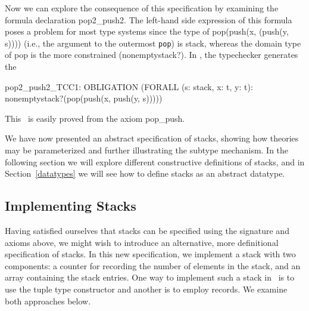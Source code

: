 Now we can explore the consequence of this specification by examining
the formula declaration {\stt pop2\_push2}.  The left-hand side
expression of this formula poses a problem for most type systems since
the type of {\stt pop(push(x, (push(y, s))))} (i.e., the argument to
the outermost {\tt pop}) is {\stt stack}, whereas the domain type of
{\stt pop} is the more constrained {\stt (nonemptystack?)}.  In \pvs,
the typechecker generates the \tcc\
\begin{pvsex}
  pop2_push2_TCC1: OBLIGATION
    (FORALL (s: stack, x: t, y: t):
       nonemptystack?(pop(push(x, push(y, s)))))
\end{pvsex}
This \tcc\ is easily proved from the axiom {\stt pop\_push}.

We have now presented an abstract specification of stacks, showing how
theories may be parameterized and further illustrating the subtype
mechanism.  In the following section we will explore different
constructive definitions of stacks, and in Section~\ref{datatypes} we
will see how to define stacks as an abstract datatype.


\subsection{Implementing Stacks}

Having satisfied ourselves that stacks can be specified using the
signature and axioms above, we might wish to introduce an alternative,
more definitional specification of stacks.  In this new specification,
we implement a stack with two components: a counter for recording the
number of elements in the stack, and an array containing the stack
entries.  One way to implement such a stack in \pvs\ is to use the tuple
type constructor and another is to employ records.  We examine both
approaches below.

